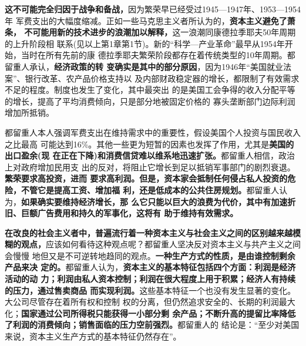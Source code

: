 \textbf{这不可能完全归因于战争和备战，}因为繁荣早已经受过1945—1947年、1953—1954年
军费支出的大幅度缩减。正如一些马克思主义者所认为的，\textbf{资本主义避免了萧条，
  不可能用新的技术进步的浪潮加以解释，}这一浪潮同康德拉季耶夫50年周期的上升阶段相
联系(见以上第1章第1节)。新的“科学—产业革命”最早从1954年开始，当时在所有先前的康
德拉季耶夫繁荣阶段都存在着传统类型的10年周期。都留重人承认，\textbf{经济政策的转
  变确实是其中的部分原因}，因为1946年“美国就业法案”、银行改革、农产品价格支持以
及内部财政稳定器的增长，都限制了有效需求不足的程度。制度也发生了变化，其中最突出
的是美国工会争得的收入分配平等的增长，提高了平均消费倾向，只是部分地被固定价格的
寡头垄断部门边际利润增加所抵销。

都留重人本人强调军费支出在维持需求中的重要性，假设美国个人投资与国民收入之比最高
可能达到16\%。其他一些更为短暂的因素也发挥了作用，尤其是\textbf{美国的出口盈余(现
  在正在下降)和消费信贷难以维系地迅速扩张。}都留重人相信，政治上对政府增加民用支
出的反对，将阻止它增长到足以抵销军事部门的剧烈衰退。\textbf{繁荣要求高投资，进而
  要求高利润。但是，资本家会抵制任何侵占私人投资的危险，不管它是提高工资、增加福
  利，还是低成本的公共住房规划。}都留重人认为，\textbf{如果确实要维持经济增长，那
  么它只能以巨大的浪费为代价，其中有加速折旧、巨额广告费用和持久的军事化，这将有
  助于维持有效需求。}

\textbf{在改良的社会主义者中，普遍流行着一种资本主义与社会主义之间的区别越来越模
  糊的观点，}应该如何看待这种观点呢？都留重人坚决反对资本主义与共产主义之间会慢慢
地但又是不可逆转地趋同的观点。\textbf{一种生产方式的性质，是由谁控制剩余产品来决
  定的。}都留重人认为，\textbf{资本主义的基本特征包括四个方面：利润是经济活动的动
  力；利润由私人资本控制；利润在很大程度上用于积累；经济人有持续的压力，通过售卖商品
  而实现利润。}这些基本特征一个也没有发生显著的变化。大公司尽管存在着所有权和控制
权的分离，但仍然追求安全的、长期的利润最大化；\textbf{国家通过公司所得税只能获得一小部分剩
余产品；不断升高的提留比率降低了利润的消费倾向；销售面临的压力空前强烈。}都留重人的
结论是：“至少对美国来说，资本主义生产方式的基本特征仍然存在”。


